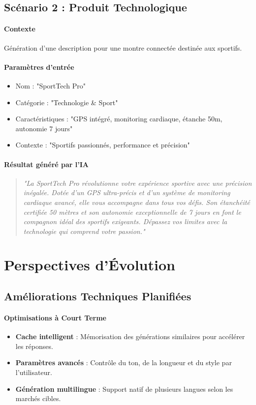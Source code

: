 \subsection{Scénario 2 : Produit Technologique}

\paragraph{Contexte}
Génération d'une description pour une montre connectée destinée aux sportifs.

\paragraph{Paramètres d'entrée}
\begin{itemize}[label=\textbullet]
    \item Nom : "SportTech Pro"
    \item Catégorie : "Technologie & Sport"
    \item Caractéristiques : "GPS intégré, monitoring cardiaque, étanche 50m, autonomie 7 jours"
    \item Contexte : "Sportifs passionnés, performance et précision"
\end{itemize}

\paragraph{Résultat généré par l'IA}
\begin{quote}
\textit{"La SportTech Pro révolutionne votre expérience sportive avec une précision inégalée. Dotée d'un GPS ultra-précis et d'un système de monitoring cardiaque avancé, elle vous accompagne dans tous vos défis. Son étanchéité certifiée 50 mètres et son autonomie exceptionnelle de 7 jours en font le compagnon idéal des sportifs exigeants. Dépassez vos limites avec la technologie qui comprend votre passion."}
\end{quote}

\section{Perspectives d'Évolution}

\subsection{Améliorations Techniques Planifiées}

\paragraph{Optimisations à Court Terme}
\begin{itemize}[label=\textbullet]
    \item \textbf{Cache intelligent} : Mémorisation des générations similaires pour accélérer les réponses.
    \item \textbf{Paramètres avancés} : Contrôle du ton, de la longueur et du style par l'utilisateur.
    \item \textbf{Génération multilingue} : Support natif de plusieurs langues selon les marchés cibles.
\end{itemize}

